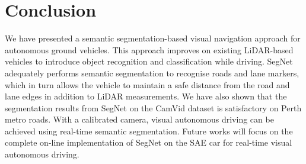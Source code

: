 \section{Conclusion}
We have presented a semantic segmentation-based visual navigation approach for autonomous ground vehicles. This approach improves on existing LiDAR-based vehicles to introduce object recognition and classification while driving. SegNet adequately performs semantic segmentation to recognise roads and lane markers, which in turn allows the vehicle to maintain a safe distance from the road and lane edges in addition to LiDAR measurements. We have also shown that the segmentation results from SegNet on the CamVid dataset is satisfactory on Perth metro roads. With a calibrated camera, visual autonomous driving can be achieved using real-time semantic segmentation. Future works will focus on the complete on-line implementation of SegNet on the SAE car for real-time visual autonomous driving.